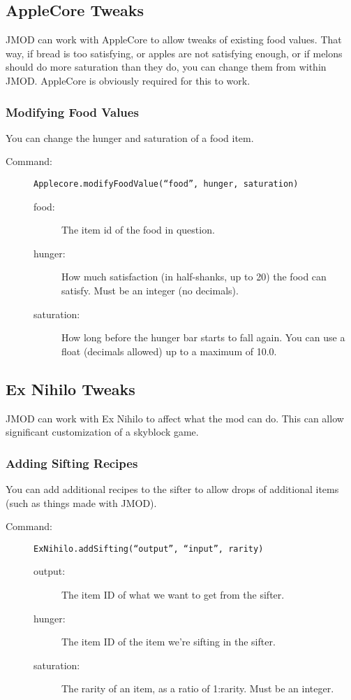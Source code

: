 \documentclass[letterpaper,titlepage,12pt]{article}
\begin{document}
\subsection{AppleCore Tweaks}

JMOD can work with AppleCore to allow tweaks of existing food values.  That way, if bread is too satisfying, or apples are not satisfying enough, or if melons should do more saturation than they do, you can change them from within JMOD.  AppleCore is obviously required for this to work.

\subsubsection{Modifying Food Values}

You can change the hunger and saturation of a food item.

\begin{description}
\item[Command:] \texttt{Applecore.modifyFoodValue(``food'', hunger, saturation)}
\begin{description}
\item [food:] The item id of the food in question.
\item [hunger:] How much satisfaction (in half-shanks, up to 20) the food can satisfy.  Must be an integer (no decimals).
\item [saturation:] How long before the hunger bar starts to fall again.  You can use a float (decimals allowed) up to a maximum of 10.0.
\end{description}
\end{description}

\subsection{Ex Nihilo Tweaks}

JMOD can work with Ex Nihilo to affect what the mod can do.  This can allow significant customization of a skyblock game.

\subsubsection{Adding Sifting Recipes}

You can add additional recipes to the sifter to allow drops of additional items (such as things made with JMOD).

\begin{description}
\item[Command:] \texttt{ExNihilo.addSifting(``output'', ``input'', rarity)}
\begin{description}
\item [output:] The item ID of what we want to get from the sifter.
\item [hunger:] The item ID of the item we're sifting in the sifter.
\item [saturation:] The rarity of an item, as a ratio of 1:rarity.  Must be an integer.
\end{description}
\end{description}
\end{document}
